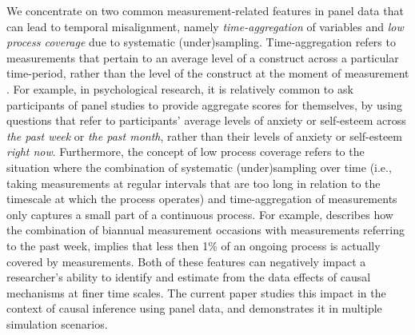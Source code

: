 \documentclass[man]{apa7} %
\begin{document}
We concentrate on two common measurement-related features in panel data that can lead to temporal misalignment, namely \textit{time-aggregation} of variables and \textit{low process coverage} due to systematic (under)sampling. Time-aggregation refers to measurements that pertain to an average level of a construct across a particular time-period, rather than the level of the construct at the moment of measurement \parencite{petkovic_aggregation_2009}. For example, in psychological research, it is relatively common to ask participants of panel studies to provide aggregate scores for themselves, by using questions that refer to participants' average levels of anxiety or self-esteem across \textit{the past week} or \textit{the past month}, rather than their levels of anxiety or self-esteem \textit{right now}. Furthermore, the concept of low process coverage refers to the situation where the combination of systematic (under)sampling over time (i.e., taking measurements at regular intervals that are too long in relation to the timescale at which the process operates) and time-aggregation of measurements only captures a small part of a continuous process. For example, \textcite{hamaker_within-between_2023} describes how the combination of biannual measurement occasions with measurements referring to the past week, implies that less then 1\% of an ongoing process is actually covered by measurements. Both of these features can negatively impact a researcher's ability to identify and estimate from the data effects of causal mechanisms at finer time scales. The current paper studies this impact in the context of causal inference using panel data, and demonstrates it in multiple simulation scenarios. 
\end{document}
